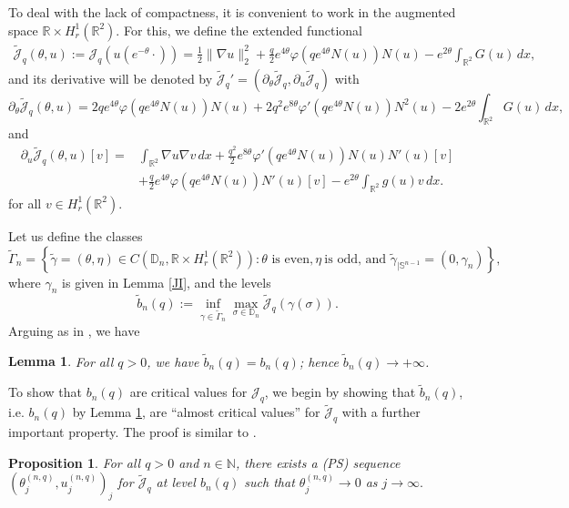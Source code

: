 \documentclass[11pt,leqno,twoside,reqno]{amsart}
\numberwithin{equation}{section}
\newtheorem{lemma}[theorem]{Lemma}
\newtheorem{proposition}[theorem]{Proposition}
\begin{document}
To deal with the lack of compactness, it is convenient to work in the augmented space $\mathbb R\times H^{1}_{r}(\mathbb R^{2}).$
For this, we define the extended functional
\begin{equation}\label{extended}
\begin{split}
\tilde{\mathcal J}_{q}(\theta,u):=\mathcal J_{q}(u(e^{-\theta}\cdot))=
\frac{1}{2}\|\nabla u\|_{2}^{2}+
\frac{q}{2}e^{4\theta}\varphi(qe^{4\theta}N(u))N(u)-e^{2\theta}\int_{\mathbb R^{2}} G(u)\,dx,
\end{split}
\end{equation} 
and its derivative will be denoted by
$\tilde {\mathcal J}_{q}'=
(\partial_{\theta} \tilde {\mathcal J}_{q}, \partial_{u}\tilde {\mathcal J}_{q})$
with
\begin{equation}\label{partialtheta}
\partial_{\theta} \tilde {\mathcal J}_{q}(\theta, u)=
2q e^{4\theta}\varphi(qe^{4\theta}N(u))N(u)
+2q^2 e^{8\theta} \varphi'(qe^{4\theta}N(u))N^2(u)
-2e^{2\theta}\int_{\mathbb R^2} G(u)\,dx,
\end{equation}
and
\begin{equation}
\label{partialu}
\begin{split}
\partial_{u} \tilde {\mathcal J}_{q}(\theta, u)[v] =&  \int_{\mathbb R^{2}} \nabla u \nabla v\,dx+
\frac{q^2}{2}e^{8\theta}\varphi'(qe^{4\theta}N(u))N(u) N'(u)[v] \\
& +\frac{q}{2}e^{4\theta}\varphi(qe^{4\theta}N(u))N'(u)[v] -e^{2\theta}\int_{\mathbb R^{2}}g(u)v\,dx.
\end{split}
\end{equation}
for all $v\in H_r^1(\mathbb R^{2})$.

Let us define the classes
\[
\tilde\Gamma_{n}=\left\{\tilde\gamma=(\theta, \eta)\in C(\mathbb D_{n}, \mathbb R\times H^{1}_{r}(\mathbb R^{2})):
\theta \text{ is even}, \eta \ \text{is odd, and }\tilde \gamma_{|\mathbb S^{n-1}}=(0,\gamma_{n})\right\},
\]
where $\gamma_{n}$ is given in Lemma \ref{JI}, and the levels
\begin{equation*}
\tilde b_{n}(q):= \inf_{\gamma\in \tilde \Gamma_{n}}\max_{\sigma\in \mathbb D_{n}} \tilde {\mathcal J}_{q}(\gamma(\sigma)).
\end{equation*}
Arguing as in \cite[Lemma 4.1]{HIT}, we have
\begin{lemma}\label{bn}
For all $q>0$, we have $\tilde b_{n}(q)=b_{n}(q)$; hence $\tilde b_{n}(q) \to +\infty$. 
\end{lemma}

To show that $b_{n}(q)$ are critical values for $\mathcal J_{q}$, we begin by showing that $\tilde b_{n}(q)$,
i.e. $b_{n}(q)$ by Lemma \ref{bn}, are ``almost critical values'' for $\tilde {\mathcal J}_{q}$ with a further important property. 
The proof is similar to \cite[Proposition 4.2]{HIT}.
\begin{proposition}\label{propPS}
For all $q>0$ and $n\in \mathbb N$, there exists a (PS) sequence $(\theta_{j}^{(n,q)}, u_{j}^{(n,q)})_{j}$
for $\tilde {\mathcal J}_{q}$ at level $ b_{n}(q)$ such that $\theta_{j}^{(n,q)}\to 0$ as $j\to\infty.$
\end{proposition}
\end{document}
